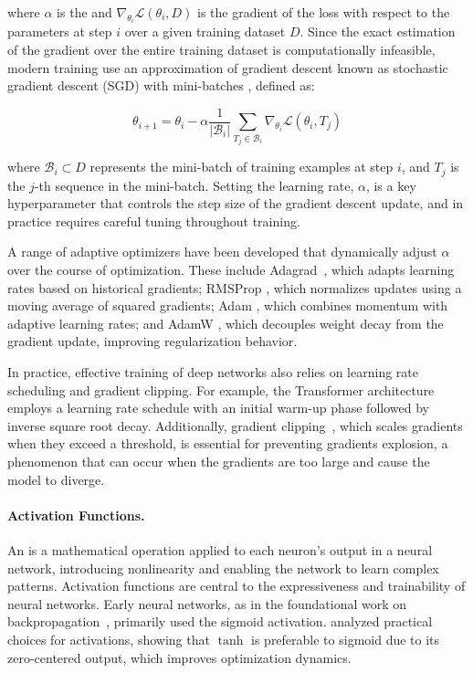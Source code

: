 where $\alpha$ is the  and $\nabla_{\theta_i} \mathcal{L}(\theta_i, D)$ is the gradient of the loss with respect to the parameters at step $i$ over a given training dataset $D$. Since the exact estimation of the gradient over the entire training dataset is computationally infeasible, modern training use an approximation of gradient descent known as stochastic gradient descent (SGD) with mini-batches \citep{robbins1951stochastic}, defined as:

\begin{equation}
    \theta_{i+1} = \theta_i - \alpha  \frac{1}{\lvert \mathcal{B}_i\rvert} \sum_{T_j \in \mathcal{B}_i} \nabla_{\theta_i} \mathcal{L}(\theta_i, T_j)
\end{equation}

where $\mathcal{B}_i \subset D$ represents the mini-batch of training examples at step $i$, and $T_j$ is the $j$-th sequence in the mini-batch. Setting the learning rate, $\alpha$, is a key hyperparameter that controls the step size of the gradient descent update, and in practice requires careful tuning throughout training.

A range of adaptive optimizers have been developed that dynamically adjust $\alpha$ over the course of optimization. These include Adagrad~\citep{duchi2011adaptive}, which adapts learning rates based on historical gradients; RMSProp \citep{tieleman2012lecture}, which normalizes updates using a moving average of squared gradients; Adam \citep{kingma2015adam}, which combines momentum with adaptive learning rates; and AdamW \citep{loshchilov2019decoupled}, which decouples weight decay from the gradient update, improving regularization behavior.

In practice, effective training of deep networks also relies on learning rate scheduling and gradient clipping. For example, the Transformer architecture~\citep{vaswani2017attention} employs a learning rate schedule with an initial warm-up phase followed by inverse square root decay. Additionally, gradient clipping~\citep{pascanu2013difficulty}, which scales gradients when they exceed a threshold, is essential for preventing gradients explosion, a phenomenon that can occur when the gradients are too large and cause the model to diverge.

\paragraph{Activation Functions.} 

An  is a mathematical operation applied to each neuron's output in a neural network, introducing nonlinearity and enabling the network to learn complex patterns. Activation functions are central to the expressiveness and trainability of neural networks. Early neural networks, as in the foundational work on backpropagation~\citep{rumelhart1986learning}, primarily used the sigmoid activation. \citet{lecun1998efficient} analyzed practical choices for activations, showing that $\tanh$ is preferable to sigmoid due to its zero-centered output, which improves optimization dynamics.


